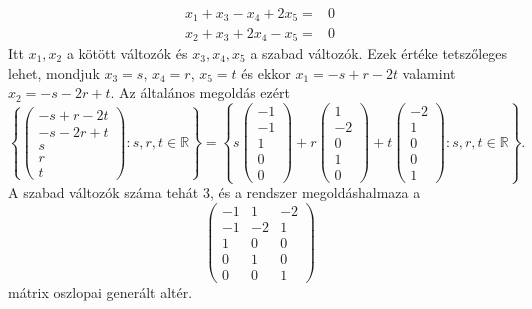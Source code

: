 \documentclass[9pt, a4paper, showtrims]{memoir}
\theoremstyle{plain}
\theoremstyle{remark}
\theoremstyle{definition}
\begin{document}
\begin{enumerate}
\[\begin{array}{rl}
                x_1+x_3-x_4+2x_5=&0\\
                x_2+x_3+2x_4-x_5=&0
            \end{array}
        \]
        Itt $x_1,x_2$ a kötött változók és $x_3,x_4,x_5$ a szabad változók.
        Ezek értéke tetszőleges lehet, mondjuk $x_3=s$, $x_4=r$, $x_5=t$ és ekkor 
        $x_1=-s+r-2t$ valamint $x_2=-s-2r+t$.
        Az általános megoldás ezért
        \[
            \left\{ 
                \begin{pmatrix}
                    -s+r-2t\\
                    -s-2r+t\\
                    s\\
                    r\\
                    t
                \end{pmatrix}
                :s,r,t\in\mathbb{R}
            \right\}
            =
            \left\{ s
                \begin{pmatrix}
                    -1\\-1\\1\\0\\0
                \end{pmatrix}
                +
                r
                \begin{pmatrix}
                    1\\-2\\0\\1\\0
                \end{pmatrix}
                +
                t
                \begin{pmatrix}
                    -2\\1\\0\\0\\1
                \end{pmatrix}
                :s,r,t\in\mathbb{R}
            \right\}.
        \]
        A szabad változók száma tehát $3$, 
        és a rendszer megoldáshalmaza a 
        \[
            \begin{pmatrix}
                -1&1&-2\\
                -1&-2&1\\
                1&0&0\\
                0&1&0\\
                0&0&1
            \end{pmatrix}
        \]
        mátrix oszlopai generált altér.
\end{enumerate}
\end{document}
